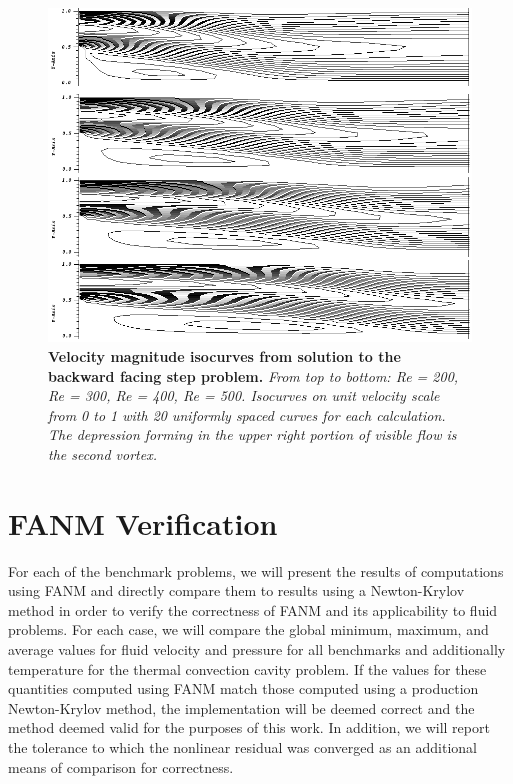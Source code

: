 \begin{figure}[t!]
  \begin{center}
    \includegraphics[width=6in]{chapters/nonlinear_problem/step_velocity_isocurves.png}
  \end{center}
  \caption{\textbf{Velocity magnitude isocurves from solution to the
      backward facing step problem.} \textit{From top to bottom: Re =
      200, Re = 300, Re = 400, Re = 500. Isocurves on unit velocity
      scale from 0 to 1 with 20 uniformly spaced curves for each
      calculation. The depression forming in the upper right portion
      of visible flow is the second vortex.}}
  \label{fig:step_velocity_isocurves}
\end{figure}

\clearpage

\section{FANM Verification\ }
\label{sec:fanm_verification}

For each of the benchmark problems, we will present the results of
computations using FANM and directly compare them to results using a
Newton-Krylov method in order to verify the correctness of FANM and
its applicability to fluid problems. For each case, we will compare
the global minimum, maximum, and average values for fluid velocity and
pressure for all benchmarks and additionally temperature for the
thermal convection cavity problem. If the values for these quantities
computed using FANM match those computed using a production
Newton-Krylov method, the implementation will be deemed correct and
the method deemed valid for the purposes of this work. In addition, we
will report the tolerance to which the nonlinear residual was
converged as an additional means of comparison for correctness.


